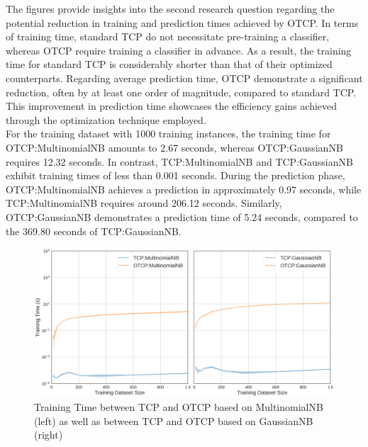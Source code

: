 \documentclass[10pt]{reportMaster}
\begin{document}
\noindent The figures provide insights into the second research question regarding the potential reduction in training and prediction times achieved by OTCP. In terms of training time, standard TCP do not necessitate pre-training a classifier, whereas OTCP require training a classifier in advance. As a result, the training time for standard TCP is considerably shorter than that of their optimized counterparts. Regarding average prediction time, OTCP demonstrate a significant reduction, often by at least one order of magnitude, compared to standard TCP. This improvement in prediction time showcases the efficiency gains achieved through the optimization technique employed.\\

\noindent For the training dataset with 1000 training instances, the training time for OTCP:MultinomialNB amounts to 2.67 seconds, whereas OTCP:GaussianNB requires 12.32 seconds. In contrast, TCP:MultinomialNB and TCP:GaussianNB exhibit training times of less than 0.001 seconds. During the prediction phase, OTCP:MultinomialNB achieves a prediction in approximately 0.97 seconds, while TCP:MultinomialNB requires around 206.12 seconds. Similarly, OTCP:GaussianNB demonstrates a prediction time of 5.24 seconds, compared to the 369.80 seconds of TCP:GaussianNB. 

\begin{figure}[H]
    \centering
    \includegraphics[width = 13cm]{figures/TrainingTime_1.png}
    \caption{Training Time between TCP and OTCP based on MultinomialNB (left) as well as between TCP and OTCP based on GaussianNB (right)}
    \label{fig:TrainingTime_1}
\end{figure}
\end{document}
